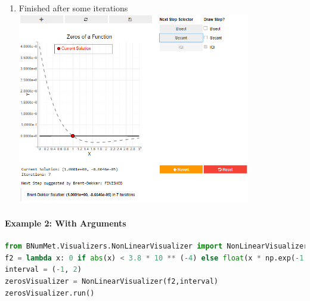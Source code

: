 \begin{enumerate}
    \item Finished after some iterations\\
    \includegraphics[width=0.8\textwidth]{Include/Images/Thesis/Documentation/Visualizers/NonLinear/Example 1/Example 1 - 04 - Finished.png}
   
\end{enumerate}



\paragraph{Example 2: With Arguments}
\begin{lstlisting}[language=Python]
from BNumMet.Visualizers.NonLinearVisualizer import NonLinearVisualizer
f2 = lambda x: 0 if abs(x) < 3.8 * 10 ** (-4) else float(x * np.exp(-1 / x**2))
interval = (-1, 2)
zerosVisualizer = NonLinearVisualizer(f2,interval)
zerosVisualizer.run()
\end{lstlisting}

